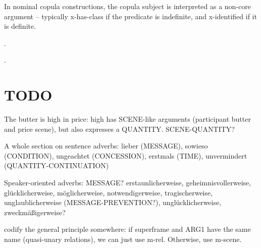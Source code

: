 \documentclass[a4paper]{article}
\newcommand{\rl}[1]{\textsf{#1}}
\begin{document}
In nominal copula constructions, the copula subject is interpreted as a
non-core argument -- typically \rl{x-has-class} if the predicate is indefinite,
and \rl{x-identified} if it is definite.

\ex.

\ex.

\newpage\section{TODO}

The butter is high in price: high has SCENE-like arguments (participant butter
and price scene), but also expresses a QUANTITY. SCENE-QUANTITY?

A whole section on sentence adverbs: lieber (MESSAGE), sowieso (CONDITION),
ungeachtet (CONCESSION), erstmals (TIME), unvermindert (QUANTITY-CONTINUATION)

Speaker-oriented adverbs: MESSAGE? erstaunlicherweise, geheimnisvollerweise,
glücklicherweise, möglicherweise, notwendigerweise, tragischerweise,
unglaublicherweise (MESSAGE-PREVENTION?), unglücklicherweise, zweckmäßigerweise?

codify the general principle somewhere: if superframe and ARG1 have the same
name (quasi-unary relations), we can just use m-rel. Otherwise, use m-scene.



\end{document}
